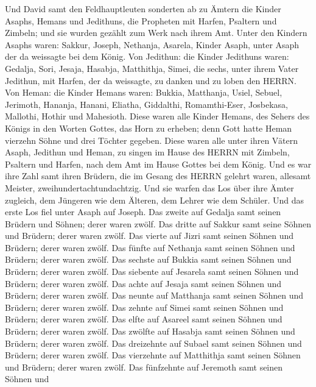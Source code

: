 Und David samt den Feldhauptleuten sonderten ab zu Ämtern
die Kinder Asaphs, Hemans und Jedithuns, die Propheten mit Harfen,
Psaltern und Zimbeln; und sie wurden gezählt zum Werk nach ihrem Amt.
 Unter den Kindern Asaphs waren: Sakkur, Joseph, Nethanja,
Asarela, Kinder Asaph, unter Asaph der da weissagte bei dem König.
 Von Jedithun: die Kinder Jedithuns waren: Gedalja, Sori,
Jesaja, Hasabja, Matthithja, Simei, die sechs, unter ihrem Vater
Jedithun, mit Harfen, der da weissagte, zu danken und zu loben den
HERRN.  Von Heman: die Kinder Hemans waren: Bukkia,
Matthanja, Usiel, Sebuel, Jerimoth, Hananja, Hanani, Eliatha, Giddalthi,
Romamthi-Eser, Josbekasa, Mallothi, Hothir und Mahesioth. 
Diese waren alle Kinder Hemans, des Sehers des Königs in den Worten
Gottes, das Horn zu erheben; denn Gott hatte Heman vierzehn Söhne und
drei Töchter gegeben.  Diese waren alle unter ihren Vätern
Asaph, Jedithun und Heman, zu singen im Hause des HERRN mit Zimbeln,
Psaltern und Harfen, nach dem Amt im Hause Gottes bei dem König.
 Und es war ihre Zahl samt ihren Brüdern, die im Gesang des
HERRN gelehrt waren, allesamt Meister, zweihundertachtundachtzig.
 Und sie warfen das Los über ihre Ämter zugleich, dem
Jüngeren wie dem Älteren, dem Lehrer wie dem Schüler.  Und
das erste Los fiel unter Asaph auf Joseph. Das zweite auf Gedalja samt
seinen Brüdern und Söhnen; derer waren zwölf.  Das dritte
auf Sakkur samt seine Söhnen und Brüdern; derer waren zwölf.
 Das vierte auf Jizri samt seinen Söhnen und Brüdern; derer
waren zwölf.  Das fünfte auf Nethanja samt seinen Söhnen
und Brüdern; derer waren zwölf.  Das sechste auf Bukkia
samt seinen Söhnen und Brüdern; derer waren zwölf.  Das
siebente auf Jesarela samt seinen Söhnen und Brüdern; derer waren zwölf.
 Das achte auf Jesaja samt seinen Söhnen und Brüdern; derer
waren zwölf.  Das neunte auf Matthanja samt seinen Söhnen
und Brüdern; derer waren zwölf.  Das zehnte auf Simei samt
seinen Söhnen und Brüdern; derer waren zwölf.  Das elfte
auf Asareel samt seinen Söhnen und Brüdern; derer waren zwölf.
 Das zwölfte auf Hasabja samt seinen Söhnen und Brüdern;
derer waren zwölf.  Das dreizehnte auf Subael samt seinen
Söhnen und Brüdern; derer waren zwölf.  Das vierzehnte auf
Matthithja samt seinen Söhnen und Brüdern; derer waren zwölf.
 Das fünfzehnte auf Jeremoth samt seinen Söhnen und
